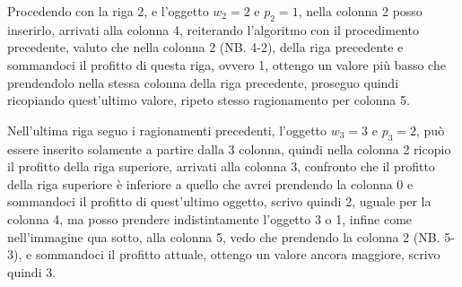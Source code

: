 \documentclass{article}
\begin{document}
Procedendo con la riga 2, e l'oggetto $w_2=2$ e $p_2=1$, nella colonna 2 posso inserirlo, arrivati alla colonna 4, reiterando l'algoritmo con il procedimento precedente, valuto che nella colonna 2 (NB. 4-2), della riga precedente e sommandoci il profitto di questa riga, ovvero 1, ottengo un valore più basso che prendendolo nella stessa colonna della riga precedente, proseguo quindi ricopiando quest'ultimo valore, ripeto stesso ragionamento per colonna 5.




Nell'ultima riga seguo i ragionamenti precedenti, l'oggetto $w_3=3$ e $p_3=2$, può essere inserito solamente a partire dalla 3 colonna, quindi nella colonna 2 ricopio il profitto della riga superiore, arrivati alla colonna 3, confronto che il profitto della riga superiore è inferiore a quello che avrei prendendo la colonna 0 e sommandoci il profitto di quest'ultimo oggetto, scrivo quindi 2, uguale per la colonna 4, ma posso prendere indistintamente l'oggetto 3 o 1, infine come nell'immagine qua sotto, alla colonna 5, vedo che prendendo la colonna 2 (NB. 5-3), e sommandoci il profitto attuale, ottengo un valore ancora maggiore, scrivo quindi 3.

 
\end{document}
